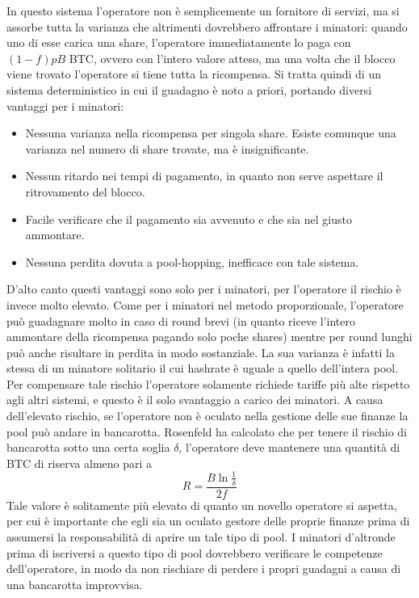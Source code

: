 In questo sistema l'operatore non è semplicemente un fornitore di servizi, ma si assorbe tutta la varianza che altrimenti dovrebbero affrontare i minatori: quando uno di esse carica una share, l'operatore immediatamente lo paga con $(1-f)pB$ BTC, ovvero con l'intero valore atteso, ma una volta che il blocco viene trovato l'operatore si tiene tutta la ricompensa.
Si tratta quindi di un sistema deterministico in cui il guadagno è noto a priori, portando diversi vantaggi per i minatori:
\begin{itemize}
    \item Nessuna varianza nella ricompensa per singola share. Esiste comunque una varianza nel numero di share trovate, ma è insignificante.
    \item Nessun ritardo nei tempi di pagamento, in quanto non serve aspettare il ritrovamento del blocco.
    \item Facile verificare che il pagamento sia avvenuto e che sia nel giusto ammontare.
    \item Nessuna perdita dovuta a pool-hopping, inefficace con tale sistema.
\end{itemize}
D'alto canto questi vantaggi sono solo per i minatori, per l'operatore il rischio è invece molto elevato. Come per i minatori nel metodo proporzionale, l'operatore può guadagnare molto in caso di round brevi (in quanto riceve l'intero ammontare della ricompensa pagando solo poche shares) mentre per round lunghi può anche risultare in perdita in modo sostanziale. La sua varianza è infatti la stessa di un minatore solitario il cui hashrate è uguale a quello dell'intera pool. Per compensare tale rischio l'operatore solamente richiede tariffe più alte rispetto agli altri sistemi, e questo è il solo svantaggio a carico dei minatori.
A causa dell'elevato rischio, se l'operatore non è oculato nella gestione delle sue finanze la pool può andare in bancarotta. Rosenfeld ha calcolato che per tenere il rischio di bancarotta sotto una certa soglia $\delta$, l'operatore deve mantenere una quantità di BTC di riserva almeno pari a
\[R = \frac{B \ln\frac{1}{\delta} }{2f}\]
Tale valore è solitamente più elevato di quanto un novello operatore si aspetta, per cui è importante che egli sia un oculato gestore delle proprie finanze prima di assumersi la responsabilità di aprire un tale tipo di pool. I minatori d'altronde prima di iscriversi a questo tipo di pool dovrebbero verificare le competenze dell'operatore, in modo da non rischiare di perdere i propri guadagni a causa di una bancarotta improvvisa.

